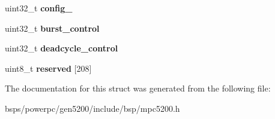 \begin{DoxyCompactItemize}
uint32\+\_\+t {\bfseries config\+\_}
\item 
\mbox{\label{structmpc5200__csc_afa824d6404944a253b4e54e18a78cea6}} 
uint32\+\_\+t {\bfseries burst\+\_\+control}
\item 
\mbox{\label{structmpc5200__csc_a0f48a589006fab53c964992ed247b520}} 
uint32\+\_\+t {\bfseries deadcycle\+\_\+control}
\item 
\mbox{\label{structmpc5200__csc_a9bb93e499a4a1e0194c37104dfbeb555}} 
uint8\+\_\+t {\bfseries reserved} \mbox{[}208\mbox{]}
\end{DoxyCompactItemize}


The documentation for this struct was generated from the following file\+:\begin{DoxyCompactItemize}
\item 
bsps/powerpc/gen5200/include/bsp/mpc5200.\+h\end{DoxyCompactItemize}
